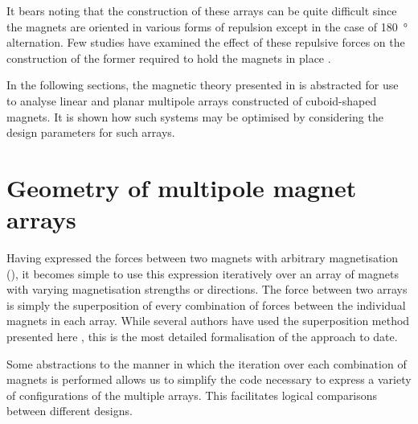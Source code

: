 \documentclass[11pt,a4paper]{memoir}
\begin{document}
It bears noting that the construction of these arrays can be quite difficult since the magnets are oriented in various forms of repulsion except in the case of \SI{180}{\degree} alternation.
Few studies have examined the effect of these repulsive forces on the construction of the former required to hold the magnets in place \cite{rovers2009-ietm}.

In the following sections, the magnetic theory presented in  is abstracted for use to analyse linear and planar multipole arrays constructed of cuboid-shaped magnets.
It is shown how such systems may be optimised by considering the design parameters for such arrays.


\section{Geometry of multipole magnet arrays}

Having expressed the forces between two magnets with arbitrary magnetisation (), it becomes simple to use this expression iteratively over an array of magnets with varying magnetisation strengths or directions. The force between two arrays is simply the superposition of every combination of forces between the individual magnets in each array.
While several authors have used the superposition method presented here \cite{allag2009-electromotion,janssen2009-jsdd}, this is the most detailed formalisation of the approach to date.

Some abstractions to the manner in which the iteration over each combination of magnets is performed allows us to simplify the code necessary to express a variety of configurations of the multiple arrays.
This facilitates logical comparisons between different designs.
\end{document}
